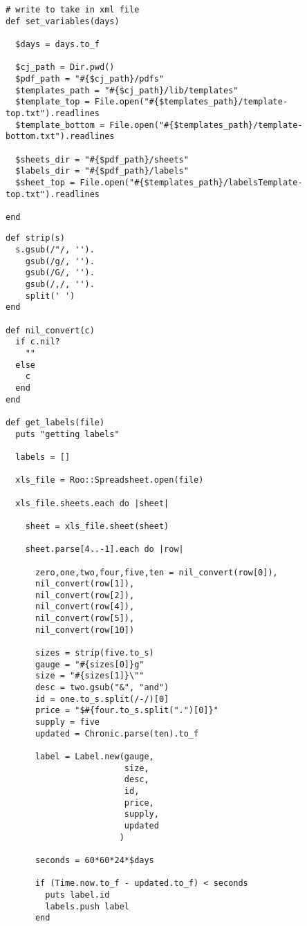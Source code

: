 \documentclass[11pt]{article}
\begin{document}
\begin{verbatim}
# write to take in xml file
def set_variables(days)

  $days = days.to_f

  $cj_path = Dir.pwd()
  $pdf_path = "#{$cj_path}/pdfs"
  $templates_path = "#{$cj_path}/lib/templates"
  $template_top = File.open("#{$templates_path}/template-top.txt").readlines
  $template_bottom = File.open("#{$templates_path}/template-bottom.txt").readlines

  $sheets_dir = "#{$pdf_path}/sheets"
  $labels_dir = "#{$pdf_path}/labels"
  $sheet_top = File.open("#{$templates_path}/labelsTemplate-top.txt").readlines

end
\end{verbatim}

\begin{verbatim}
def strip(s)
  s.gsub(/"/, '').
    gsub(/g/, '').
    gsub(/G/, '').
    gsub(/,/, '').
    split(' ')
end

def nil_convert(c)
  if c.nil?
    ""
  else
    c
  end
end

def get_labels(file)
  puts "getting labels"

  labels = []

  xls_file = Roo::Spreadsheet.open(file)

  xls_file.sheets.each do |sheet|

    sheet = xls_file.sheet(sheet)

    sheet.parse[4..-1].each do |row|

      zero,one,two,four,five,ten = nil_convert(row[0]),
      nil_convert(row[1]),
      nil_convert(row[2]),
      nil_convert(row[4]),
      nil_convert(row[5]),
      nil_convert(row[10])

      sizes = strip(five.to_s)
      gauge = "#{sizes[0]}g"
      size = "#{sizes[1]}\""
      desc = two.gsub("&", "and")
      id = one.to_s.split(/-/)[0]
      price = "$#{four.to_s.split(".")[0]}"
      supply = five
      updated = Chronic.parse(ten).to_f

      label = Label.new(gauge,
                        size,
                        desc,
                        id,
                        price,
                        supply,
                        updated
                       )

      seconds = 60*60*24*$days

      if (Time.now.to_f - updated.to_f) < seconds
        puts label.id
        labels.push label
      end


\end{verbatim}
\end{document}
